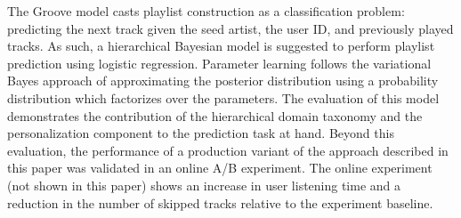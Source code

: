 The Groove model casts playlist construction as a classification problem: predicting the next track given the seed artist, the user ID, and previously played tracks. 
As such, a hierarchical Bayesian model is suggested to perform playlist prediction using logistic regression. 
Parameter learning follows the variational Bayes approach of approximating the posterior distribution using a probability distribution which factorizes over the parameters. 
The evaluation of this model demonstrates the contribution of the hierarchical domain taxonomy and the personalization component to the prediction task at hand. 
Beyond this evaluation, the performance of a production variant of the approach described in this paper was validated in an online A/B experiment. The online experiment (not shown in this paper) shows an increase in user listening time and a reduction in the number of skipped tracks relative to the experiment baseline.

